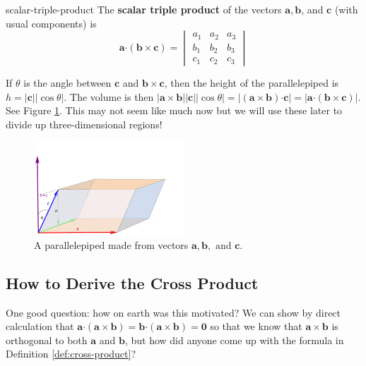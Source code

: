 \documentclass[letterpaper, 11pt, openany]{book}
\newcommand{\scdot}{\boldsymbol{\cdot}}
\theoremstyle{mytheoremstyle}
\theoremstyle{myexamplestyle}
\begin{document}
\begin{definition}{}{scalar-triple-product}
    The \textbf{scalar triple product} of the vectors \(\mathbf{a}, \mathbf{b}\), and \(\mathbf{c}\) (with usual components) is
    \[\mathbf{a} \scdot (\mathbf{b} \times \mathbf{c}) = \begin{vmatrix}
        a_1 & a_2 & a_3 \\ b_1 & b_2 & b_3 \\ c_1 & c_2 & c_3
    \end{vmatrix}\]
\end{definition}
If \(\theta\) is the angle between \(\mathbf{c}\) and \(\mathbf{b} \times \mathbf{c}\), then the height of the parallelepiped is \(h=|\mathbf{c}||\cos \theta|\). The volume is then \(|\mathbf{a} \times \mathbf{b}||\mathbf{c}||\cos \theta| = |(\mathbf{a} \times \mathbf{b})\scdot \mathbf{c}|=|\mathbf{a} \scdot (\mathbf{b} \times \mathbf{c})|\). See Figure \ref{f:parallelepiped}. This may not seem like much now but we will use these later to divide up three-dimensional regions!

\begin{figure}[htbp]
    \centering
        \includegraphics[width=0.5\textwidth]{Figures/parallelepiped.pdf}
    \caption{A parallelepiped made from vectors \(\mathbf{a},\mathbf{b}, \text{ and } \mathbf{c}\).}
    \label{f:parallelepiped}
\end{figure}

\subsection{How to Derive the Cross Product}
One good question: how on earth was this motivated? We can show by direct calculation that \(\mathbf{a}\scdot (\mathbf{a} \times \mathbf{b}) = \mathbf{b} \scdot (\mathbf{a} \times \mathbf{b}) = \mathbf{0}\) so that we know that \(\mathbf{a} \times \mathbf{b}\) is orthogonal to both \(\mathbf{a}\) and \(\mathbf{b}\), but how did anyone come up with the formula in Definition \ref{def:cross-product}?
\end{document}
